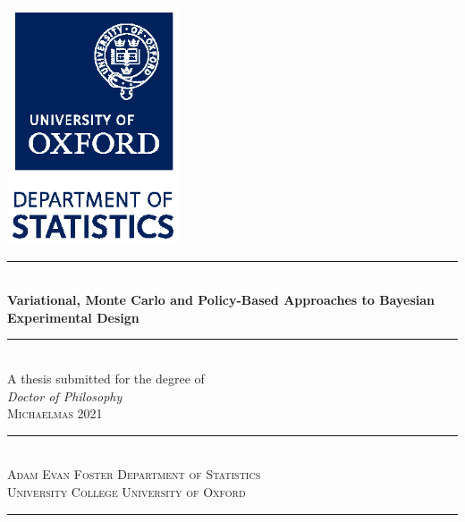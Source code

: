 \documentclass[TRANSFER_THESIS.tex]{subfiles}
\begin{document}
\thispagestyle{empty}
\begin{titlepage}
\begin{center}
\hfill \includegraphics[width=2.0in]{figures/Dept_Stats_logo_vertical_CMYK.eps} \hfill \phantom{.} \\
\vspace{2.5cm}
\rule{\textwidth}{0.5mm} \\ [16pt]
\Huge {\bfseries Variational, Monte Carlo and Policy-Based Approaches to Bayesian Experimental Design}
\rule{\textwidth}{0.5mm} \\ [4pt]
\vfill
\Large {A thesis submitted for the degree of \\ \emph{Doctor of Philosophy}} \\
\vspace{1cm}
\large \textsc{Michaelmas 2021} \\
\rule{\textwidth}{0.5mm} \\ [4pt]
{\fontsize{14}{14}\textsc{Adam Evan Foster} \hfill \textsc{Department of Statistics}} \\ [8pt]
{\fontsize{14}{14} \textsc{University College \hfill University of Oxford}}
\rule{\textwidth}{0.5mm} \\ [4pt]
\end{center}
\vspace{2cm}
\end{titlepage}
\end{document}
